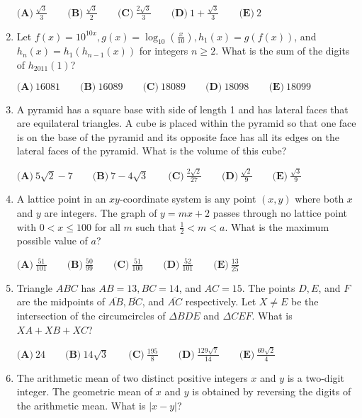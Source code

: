 \documentclass{article}
\begin{document}
\begin{enumerate}[label=\arabic*., itemsep=0.5em]
$\textbf{(A)}\ \frac{\sqrt{3}}{3} \qquad \textbf{(B)}\ \frac{\sqrt{3}}{2} \qquad \textbf{(C)}\ \frac{2\sqrt{3}}{3} \qquad \textbf{(D)}\ 1 + \frac{\sqrt{3}}{3} \qquad \textbf{(E)}\ 2$\par \vspace{0.5em}\item Let $f(x) = 10^{10x}, g(x) = \log_{10}\left(\frac{x}{10}\right), h_1(x) = g(f(x))$, and $h_n(x) = h_1(h_{n-1}(x))$ for integers $n \geq 2$. What is the sum of the digits of $h_{2011}(1)$?

$\textbf{(A)}\ 16081 \qquad \textbf{(B)}\ 16089 \qquad \textbf{(C)}\ 18089 \qquad \textbf{(D)}\ 18098 \qquad \textbf{(E)}\ 18099$\par \vspace{0.5em}\item A pyramid has a square base with side of length 1 and has lateral faces that are equilateral triangles. A cube is placed within the pyramid so that one face is on the base of the pyramid and its opposite face has all its edges on the lateral faces of the pyramid. What is the volume of this cube?

$\textbf{(A)}\ 5\sqrt{2} - 7 \qquad \textbf{(B)}\ 7 - 4\sqrt{3} \qquad \textbf{(C)}\ \frac{2\sqrt{2}}{27} \qquad \textbf{(D)}\ \frac{\sqrt{2}}{9} \qquad \textbf{(E)}\ \frac{\sqrt{3}}{9}$\par \vspace{0.5em}\item A lattice point in an $xy$-coordinate system is any point $(x, y)$ where both $x$ and $y$ are integers. The graph of $y = mx + 2$ passes through no lattice point with $0 < x \leq 100$ for all $m$ such that $\frac{1}{2} < m < a$. What is the maximum possible value of $a$?

$\textbf{(A)}\ \frac{51}{101} \qquad \textbf{(B)}\ \frac{50}{99} \qquad \textbf{(C)}\ \frac{51}{100} \qquad \textbf{(D)}\ \frac{52}{101} \qquad \textbf{(E)}\ \frac{13}{25}$\par \vspace{0.5em}\item Triangle $ABC$ has $AB = 13, BC = 14$, and $AC = 15$. The points $D, E$, and $F$ are the midpoints of $\overline{AB}, \overline{BC}$, and $\overline{AC}$ respectively. Let $X \not= E$ be the intersection of the circumcircles of $\Delta BDE$ and $\Delta CEF$. What is $XA + XB + XC$?

$\textbf{(A)}\ 24 \qquad \textbf{(B)}\ 14\sqrt{3} \qquad \textbf{(C)}\ \frac{195}{8} \qquad \textbf{(D)}\ \frac{129\sqrt{7}}{14} \qquad \textbf{(E)}\ \frac{69\sqrt{2}}{4}$\par \vspace{0.5em}\item The arithmetic mean of two distinct positive integers $x$ and $y$ is a two-digit integer. The geometric mean of $x$ and $y$ is obtained by reversing the digits of the arithmetic mean. What is $|x - y|$?


\end{enumerate}
\end{document}
